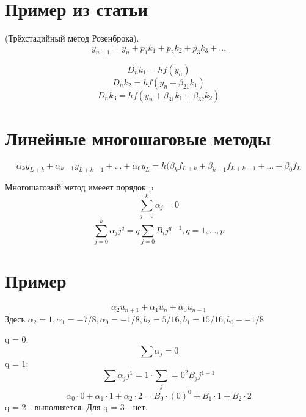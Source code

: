 \documentclass[a4paper,12pt]{article}
\begin{document}
\section*{Пример из статьи}
(Трёхстадийный метод Розенброка).
\[y_{n+1} = y_n + p_1 k_1 + p_2 k_2 + p_3 k_3 + ...\]

\[D_n k_1 = h f(y_n)\]
\[D_n k_2 = h f(y_n + \beta_{21}k_1)\]
\[D_n k_3 = h f(y_n + \beta_{31}k_1 + \beta_{32}k_2)\]

\section*{Линейные многошаговые методы}
\[\alpha_k y_{L+k} + \alpha_{k-1} y_{L+k-1} + ... + \alpha_0 y_L = h (\beta_k f_{L+k} + \beta_{k-1} f_{L+k -1} + ... + \beta_0 f_L \]

Многошаговый метод имееет порядок p
\[\sum_{j=0}^k \alpha_j = 0\]
\[\sum_{j=0}^k \alpha_j j^q = q \sum_{j=0} B_{i}j^{q-1}, q = 1, ..., p\]

\section*{Пример}
\[\alpha_2 u_{n+1} + \alpha_1 u_n + \alpha_0 u_{n-1}\]
Здесь $\alpha_2 = 1, \alpha_1 = -7/8, \alpha_0 = -1/8, b_2 = 5/16, b_1 = 15/16, b_0 - -1/8$

q = 0:
 \[\sum \alpha_j = 0\]
q = 1:
\[\sum \alpha_j j^1 = 1 \cdot \sum_j=0^2 B_j j^{1-1}\]
\[\alpha_0 \cdot 0 + \alpha_1 \cdot 1 + \alpha_2 \cdot 2 = B_0 \cdot (0)^0 + B_1 \cdot 1 + B_2 \cdot 2\]
q = 2 - выполняется. Для q = 3 - нет.
\end{document}
